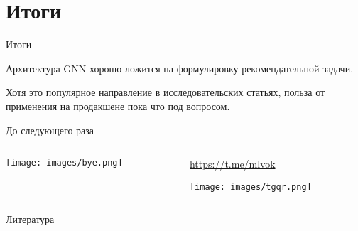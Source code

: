 \documentclass[11pt,aspectratio=169,handout]{beamer}
\begin{document}
\section{Итоги}

\begin{frame}{Итоги}

\begin{tcolorbox}[colback=info!5,colframe=info!80,title=]
Архитектура GNN хорошо ложится на формулировку рекомендательной задачи.
\end{tcolorbox}

\begin{tcolorbox}[colback=warn!5,colframe=warn!80,title=]
Хотя это популярное направление в исследовательских статьях, польза от применения на продакшене пока что под вопросом.
\end{tcolorbox}

\end{frame}

\begin{frame}{До следующего раза}

\begin{columns}
\begin{column}{0.45\textwidth}
   \begin{center}
                \texttt{[image: images/bye.png]}
   \end{center}
\end{column}
\begin{column}{0.45\textwidth}
   \begin{center}
                \url{https://t.me/mlvok}

                \texttt{[image: images/tgqr.png]}
   \end{center}
\end{column}
\end{columns}

\end{frame}

\begin{frame}[allowframebreaks]{Литература}




\end{frame}
\end{document}
